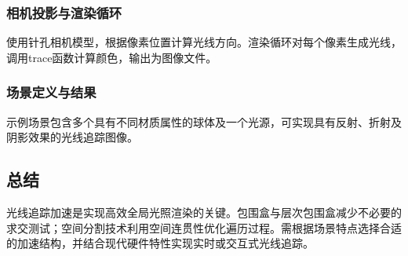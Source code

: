 \documentclass[12pt]{article}
\begin{document}
\subsubsection{相机投影与渲染循环}
使用针孔相机模型，根据像素位置计算光线方向。渲染循环对每个像素生成光线，调用trace函数计算颜色，输出为图像文件。

\subsubsection{场景定义与结果}
示例场景包含多个具有不同材质属性的球体及一个光源，可实现具有反射、折射及阴影效果的光线追踪图像。

\subsection{总结}
光线追踪加速是实现高效全局光照渲染的关键。包围盒与层次包围盒减少不必要的求交测试；空间分割技术利用空间连贯性优化遍历过程。需根据场景特点选择合适的加速结构，并结合现代硬件特性实现实时或交互式光线追踪。
\end{document}
